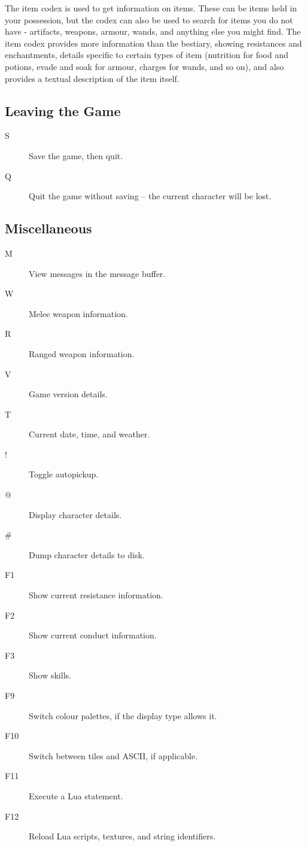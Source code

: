 The item codex is used to get information on items.  These can be items held in your possession, but the codex can also be used to search for items you do not have - artifacts, weapons, armour, wands, and anything else you might find.  The item codex provides more information than the bestiary, showing resistances and enchantments, details specific to certain types of item (nutrition for food and potions, evade and soak for armour, charges for wands, and so on), and also provides a textual description of the item itself.

\subsection{Leaving the Game}

\begin{description}
\item[S] 
Save the game, then quit.
\item[Q] 
Quit the game without saving -- the current character will be lost.
\end{description}

\subsection{Miscellaneous}

\begin{description}
\item[M]
View messages in the message buffer.
\item[W] 
Melee weapon information.
\item[R] 
Ranged weapon information.
\item[V] 
Game version details.
\item[T] 
Current date, time, and weather.
\item[!]
Toggle autopickup.
\item[@]
Display character details.
\item[\#] 
Dump character details to disk.
\item[F1] 
Show current resistance information.
\item[F2] 
Show current conduct information.
\item[F3]
Show skills.
\item[F9]
Switch colour palettes, if the display type allows it.
\item[F10]
Switch between tiles and ASCII, if applicable.
\item[F11] 
Execute a Lua statement.
\item[F12] 
Reload Lua scripts, textures, and string identifiers.
\end{description}

